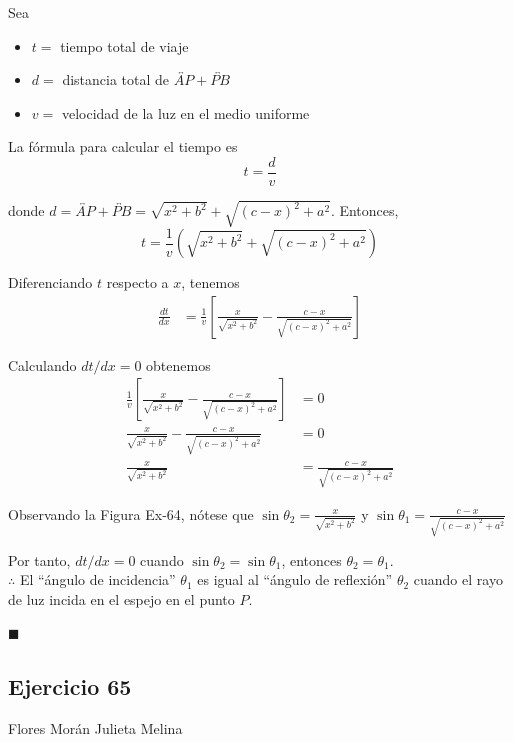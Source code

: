 \documentclass[12pt]{article}
\begin{document}
Sea
\begin{itemize}
\item $t= $ tiempo total de viaje
\item $d= $ distancia total de $\overleftrightarrow{AP}+\overleftrightarrow{PB}$
\item $v= $ velocidad de la luz en el medio uniforme
\end{itemize}

La fórmula para calcular el tiempo es 
\[
t=\frac{d}{v}
\]

donde $d=\overleftrightarrow{AP}+\overleftrightarrow{PB}=\sqrt{x^2+b^2}+\sqrt{(c-x)^2+a^2}$. Entonces,
\[
t=\frac{1}{v}\left( \sqrt{x^2+b^2}+\sqrt{(c-x)^2+a^2} \right)
\]

Diferenciando $t$ respecto a $x$, tenemos
\begin{align*}
  \frac{dt}{dx}
  &=\frac{1}{v}\left[ \frac{x}{\sqrt{x^2+b^2}}-\frac{c-x}{\sqrt{(c-x)^2+a^2}} \right]
\end{align*}

Calculando $dt/dx = 0$ obtenemos
\begin{align*}
  \frac{1}{v}\left[ \frac{x}{\sqrt{x^2+b^2}}-\frac{c-x}{\sqrt{(c-x)^2+a^2}} \right]
  &= 0 \\
  \frac{x}{\sqrt{x^2+b^2}}-\frac{c-x}{\sqrt{(c-x)^2+a^2}}
  &= 0 \\
  \frac{x}{\sqrt{x^2+b^2}}
  &=\frac{c-x}{\sqrt{(c-x)^2+a^2}}
\end{align*}

Observando la Figura Ex-64, nótese que $\sin{\theta_2}=\frac{x}{\sqrt{x^2+b^2}}$ y $\sin{\theta_1}=\frac{c-x}{\sqrt{(c-x)^2+a^2}}$

Por tanto, $dt/dx = 0$ cuando $\sin{\theta_2}=\sin{\theta_1}$, entonces $\theta_2 = \theta_1$. \\

$\therefore $ El ``ángulo de incidencia'' $\theta_1$ es igual al ``ángulo de reflexión'' $\theta_2$ cuando el rayo de luz incida en el espejo en el punto $P$.

\begin{flushright}
  $\blacksquare$
\end{flushright}

\subsection{Ejercicio 65} Flores Morán Julieta Melina \\
\end{document}
